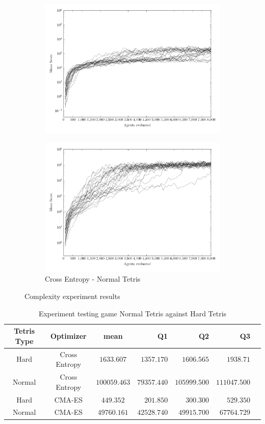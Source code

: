 \begin{figure}
\begin{subfigure}[b]{0.49\textwidth}
        \includegraphics[width=\textwidth]{data/complexity/ce_hard/PlotFile.pdf}
    \end{subfigure}
    \begin{subfigure}[b]{0.49\textwidth}
    	\caption{Cross Entropy - Normal Tetris}
        \includegraphics[width=\textwidth]{data/complexity/ce_normal/PlotFile.pdf}
    \end{subfigure}
    
    \caption{Complexity experiment results}
\end{figure}


\begin{table}[H]
\centering
\small
\begin{tabular}{c c c r r r r}
Tetris Type & Optimizer & mean & Q1 & Q2 & Q3\\
\hline
Hard & Cross Entropy & $1633.607$ & $1357.170$ & $1606.565$ & $1938.71$\\
Normal & Cross Entropy & $100059.463$ & $79357.440$ & $105999.500$ & $111047.500$\\
Hard & CMA-ES & $449.352$ & $201.850$ & $300.300$ & $529.350$\\
Normal & CMA-ES & $49760.161$ & $42528.740$ & $49915.700$ & $67764.729$\\
\end{tabular}
\caption{Experiment testing game Normal Tetris against Hard Tetris}
\end{table}


